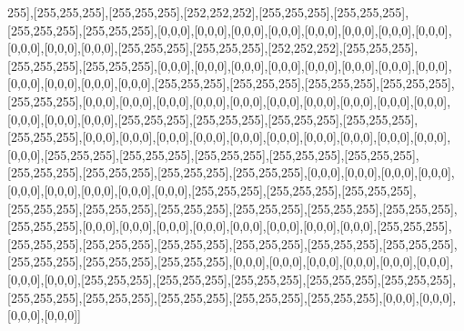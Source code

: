 255],[255,255,255],[255,255,255],[252,252,252],[255,255,255],[255,255,255],[255,255,255],[255,255,255],[0,0,0],[0,0,0],[0,0,0],[0,0,0],[0,0,0],[0,0,0],[0,0,0],[0,0,0],[0,0,0],[0,0,0],[0,0,0],[255,255,255],[255,255,255],[252,252,252],[255,255,255],[255,255,255],[255,255,255],[0,0,0],[0,0,0],[0,0,0],[0,0,0],[0,0,0],[0,0,0],[0,0,0],[0,0,0],[0,0,0],[0,0,0],[0,0,0],[0,0,0],[255,255,255],[255,255,255],[255,255,255],[255,255,255],[255,255,255],[0,0,0],[0,0,0],[0,0,0],[0,0,0],[0,0,0],[0,0,0],[0,0,0],[0,0,0],[0,0,0],[0,0,0],[0,0,0],[0,0,0],[0,0,0],[255,255,255],[255,255,255],[255,255,255],[255,255,255],[255,255,255],[0,0,0],[0,0,0],[0,0,0],[0,0,0],[0,0,0],[0,0,0],[0,0,0],[0,0,0],[0,0,0],[0,0,0],[0,0,0],[255,255,255],[255,255,255],[255,255,255],[255,255,255],[255,255,255],[255,255,255],[255,255,255],[255,255,255],[255,255,255],[0,0,0],[0,0,0],[0,0,0],[0,0,0],[0,0,0],[0,0,0],[0,0,0],[0,0,0],[0,0,0],[255,255,255],[255,255,255],[255,255,255],[255,255,255],[255,255,255],[255,255,255],[255,255,255],[255,255,255],[255,255,255],[255,255,255],[0,0,0],[0,0,0],[0,0,0],[0,0,0],[0,0,0],[0,0,0],[0,0,0],[0,0,0],[255,255,255],[255,255,255],[255,255,255],[255,255,255],[255,255,255],[255,255,255],[255,255,255],[255,255,255],[255,255,255],[255,255,255],[0,0,0],[0,0,0],[0,0,0],[0,0,0],[0,0,0],[0,0,0],[0,0,0],[0,0,0],[255,255,255],[255,255,255],[255,255,255],[255,255,255],[255,255,255],[255,255,255],[255,255,255],[255,255,255],[255,255,255],[255,255,255],[0,0,0],[0,0,0],[0,0,0],[0,0,0]]

